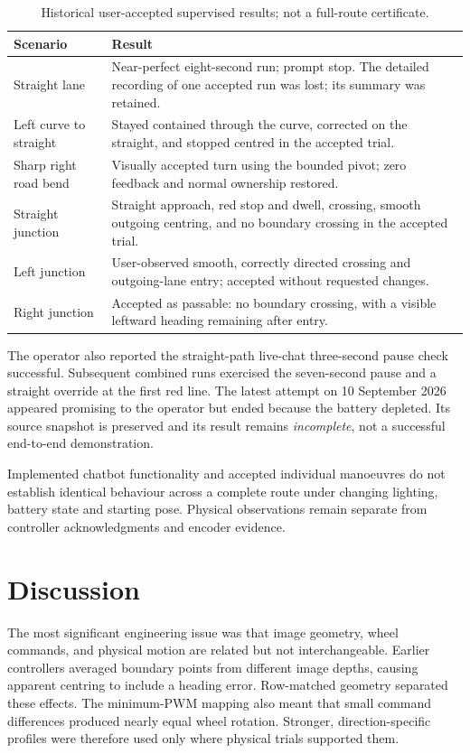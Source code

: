 \documentclass[10pt,a4paper,twocolumn]{article}
\begin{document}
\begin{table}[h]
\centering
\caption{Historical user-accepted supervised results; not a full-route certificate.}
\label{tab:physical}
\footnotesize
\begin{tabularx}{\columnwidth}{@{}p{}X@{}}
\toprule
Scenario & Result \\
\midrule
Straight lane & Near-perfect eight-second run; prompt stop. The detailed recording of one accepted run was lost; its summary was retained. \\
Left curve to straight & Stayed contained through the curve, corrected on the straight, and stopped centred in the accepted trial. \\
Sharp right road bend & Visually accepted turn using the bounded pivot; zero feedback and normal ownership restored. \\
Straight junction & Straight approach, red stop and dwell, crossing, smooth outgoing centring, and no boundary crossing in the accepted trial. \\
Left junction & User-observed smooth, correctly directed crossing and outgoing-lane entry; accepted without requested changes. \\
Right junction & Accepted as passable: no boundary crossing, with a visible leftward heading remaining after entry. \\
\bottomrule
\end{tabularx}
\end{table}

The operator also reported the straight-path live-chat three-second pause
check successful. Subsequent combined runs exercised the seven-second pause
and a straight override at the first red line. The latest attempt on
10 September 2026 appeared promising to the operator but ended because the
battery depleted. Its source snapshot is preserved and its result remains
\emph{incomplete}, not a successful end-to-end demonstration.

Implemented chatbot functionality and accepted individual manoeuvres do not
establish identical behaviour across a complete route under changing lighting,
battery state and starting pose. Physical observations remain separate from
controller acknowledgments and encoder evidence.

\balance
\section{Discussion}

The most significant engineering issue was that image geometry, wheel commands,
and physical motion are related but not interchangeable. Earlier controllers
averaged boundary points from different image depths, causing apparent centring
to include a heading error. Row-matched geometry separated these effects. The
minimum-PWM mapping also meant that small command differences produced nearly
equal wheel rotation. Stronger, direction-specific profiles were therefore used
only where physical trials supported them.
\end{document}
